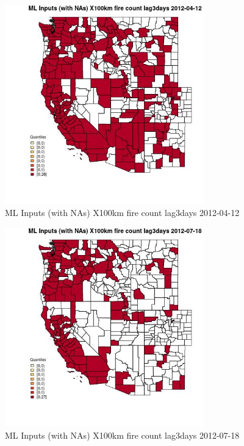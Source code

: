 \clearpage 

\begin{figure} 
\centering  
\includegraphics[width=0.77\textwidth]{Code_Outputs/Report_ML_input_PM25_Step4_part_e_de_duplicated_aves_compiled_2019-05-14wNAs_CountyX100km_fire_count_lag3daysMean2012-04-12_2012-04-12.jpg} 
\caption{\label{fig:Report_ML_input_PM25_Step4_part_e_de_duplicated_aves_compiled_2019-05-14wNAsCountyX100km_fire_count_lag3daysMean2012-04-12_2012-04-12}ML Inputs (with NAs) X100km fire count lag3days 2012-04-12} 
\end{figure} 
 

\begin{figure} 
\centering  
\includegraphics[width=0.77\textwidth]{Code_Outputs/Report_ML_input_PM25_Step4_part_e_de_duplicated_aves_compiled_2019-05-14wNAs_CountyX100km_fire_count_lag3daysMean2012-07-18_2012-07-18.jpg} 
\caption{\label{fig:Report_ML_input_PM25_Step4_part_e_de_duplicated_aves_compiled_2019-05-14wNAsCountyX100km_fire_count_lag3daysMean2012-07-18_2012-07-18}ML Inputs (with NAs) X100km fire count lag3days 2012-07-18} 
\end{figure} 
 


